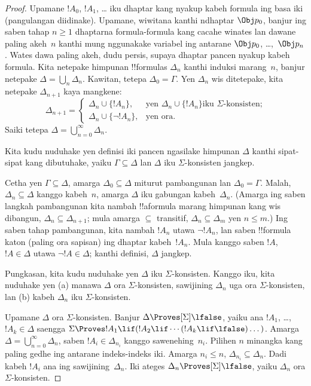 \documentclass[../../../include/open-logic-section]{subfiles}
\begin{document}
\begin{proof}
Upamane $!A_0$, $!A_1$, \dots{} iku dhaptar kang nyakup kabeh formula
ing basa iki (pangulangan diidinake). Upamane, wiwitana kanthi
ndhaptar $\Obj p_0$, banjur ing saben tahap $n \ge 1$ dhaptarna
formula-formula kang cacahe winates lan dawane paling akeh~$n$ kanthi mung nggunakake
variabel ing antarane $\Obj p_0$, \dots,~$\Obj p_n$. Wates dawa paling akeh, dudu persis, supaya dhaptar pancen nyakup kabeh formula. Kita netepake
himpunan !!{formula}s $\Delta_n$ kanthi induksi marang~$n$, banjur
netepake $\Delta = \bigcup_n \Delta_n$. Kawitan, tetepa
$\Delta_0 = \Gamma$. Yen $\Delta_n$ wis ditetepake, kita netepake
$\Delta_{n+1}$ kaya mangkene:
\[
\Delta_{n+1} =
\begin{cases}
  \Delta_n \cup \{!A_n\}, & \text{yen $\Delta_n \cup \{ !A_n\}$
    iku $\Sigma$-konsisten;} \\
  \Delta_n \cup \{ \lnot !A_n\}, & \text{yen ora.}
\end{cases}
\]
Saiki tetepa $\Delta = \bigcup_{n=0}^\infty \Delta_n$.

Kita kudu nuduhake yen definisi iki pancen ngasilake himpunan
$\Delta$ kanthi sipat-sipat kang dibutuhake, yaiku $\Gamma \subseteq \Delta$
lan $\Delta$ iku $\Sigma$-konsisten jangkep.

Cetha yen $\Gamma \subseteq \Delta$, amarga $\Delta_0 \subseteq
\Delta$ miturut pambangunan lan $\Delta_0 = \Gamma$. Malah, $\Delta_n
\subseteq \Delta$ kanggo kabeh~$n$, amarga $\Delta$ iku gabungan
kabeh~$\Delta_n$. (Amarga ing saben langkah pambangunan kita nambah
!!a{formula} marang himpunan kang wis dibangun, $\Delta_n \subseteq
\Delta_{n+1}$; mula amarga $\subseteq$ transitif, $\Delta_n \subseteq
\Delta_{m}$ yen $n \le m$.) Ing saben tahap pambangunan, kita nambah
$!A_n$ utawa $\lnot !A_n$, lan saben !!{formula} katon (paling ora
sapisan) ing dhaptar kabeh~$!A_n$. Mula kanggo saben $!A$, $!A
\in \Delta$ utawa $\lnot !A \in \Delta$; kanthi definisi, $\Delta$
jangkep.

Pungkasan, kita kudu nuduhake yen $\Delta$ iku
$\Sigma$-konsisten. Kanggo iku, kita nuduhake yen (a) manawa $\Delta$
ora $\Sigma$-konsisten, sawijining $\Delta_n$ uga ora
$\Sigma$-konsisten, lan (b) kabeh $\Delta_n$ iku $\Sigma$-konsisten.

Upamane $\Delta$ ora $\Sigma$-konsisten. Banjur $\Delta
\Proves[\Sigma] \lfalse$, yaiku ana $!A_1$, \dots,~$!A_k \in
\Delta$ saengga $\Sigma \Proves !A_1 \lif (!A_2 \lif \cdots (!A_k
\lif \lfalse)\dots)$. Amarga $\Delta = \bigcup_{n=0}^\infty \Delta_n$,
saben $!A_i \in \Delta_{n_i}$ kanggo sawenehing~$n_i$. Pilihen $n$
minangka kang paling gedhe ing antarane indeks-indeks iki. Amarga
$n_i \le n$, $\Delta_{n_i} \subseteq \Delta_n$. Dadi kabeh
$!A_i$ ana ing sawijining~$\Delta_n$. Iki ateges $\Delta_n
\Proves[\Sigma] \lfalse$, yaiku $\Delta_n$ ora $\Sigma$-konsisten.


\end{proof}
\end{document}
